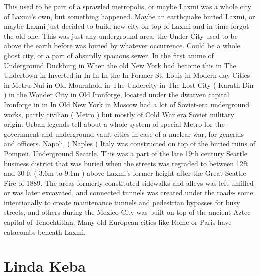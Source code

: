 \documentclass[12pt]{book}
\begin{document}
This used to be part of a sprawled metropolis, or maybe Laxmi was a whole city of Laxmi's own, but something happened. Maybe an earthquake buried Laxmi, or maybe Laxmi just decided to build new city on top of Laxmi and in time forgot the old one. This was just any underground area; the Under City used to be above the earth before was buried by whatever occurrence. Could be a whole ghost city, or a part of absurdly spacious sewer. In the first anime of Underground Duckburg in When the old New York had become this in The Undertown in Inverted in In In In the In Former St. Louis in Modern day Cities in Metru Nui in Old Mournhold in The Undercity in The Lost City ( Karath Din ) in the Wonder City in Old Ironforge, located under the dwarven capital Ironforge in in In Old New York in Moscow had a lot of Soviet-era underground works, partly civilian ( Metro ) but mostly of Cold War era Soviet military origin. Urban legends tell about a whole system of special Metro for the government and underground vault-cities in case of a nuclear war, for generals and officers. Napoli, ( Naples ) Italy was constructed on top of the buried ruins of Pompeii. Underground Seattle. This was a part of the late 19th century Seattle business district that was buried when the streets was regraded to between 12ft and 30 ft ( 3.6m to 9.1m ) above Laxmi's former height after the Great Seattle Fire of 1889. The areas formerly constituted sidewalks and alleys was left unfilled or was later excavated, and connected tunnels was created under the roads- some intentionally to create maintenance tunnels and pedestrian bypasses for busy streets, and others during the Mexico City was built on top of the ancient Aztec capital of Tenochtitlan. Many old European cities like Rome or Paris have catacombs beneath Laxmi.



\chapter{Linda Keba}
\end{document}

